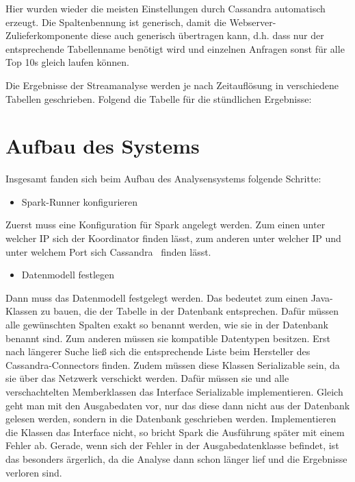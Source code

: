 \bigskip

Hier wurden wieder die meisten Einstellungen durch Cassandra automatisch
erzeugt. Die Spaltenbennung ist generisch, damit die
Webserver-Zulieferkomponente diese auch generisch übertragen kann, d.h.
dass nur der entsprechende Tabellenname benötigt wird und einzelnen
Anfragen sonst für alle Top 10s gleich laufen können.

\bigskip

Die Ergebnisse der Streamanalyse werden je nach Zeitauflösung in verschiedene Tabellen geschrieben.
Folgend die Tabelle für die stündlichen Ergebnisse:


\section{Aufbau des Systems}
Insgesamt fanden sich beim Aufbau des Analysensystems folgende Schritte:

\begin{itemize}
\item Spark-Runner konfigurieren
\end{itemize}
Zuerst muss eine Konfiguration für Spark angelegt werden. Zum einen
unter welcher IP sich der Koordinator finden lässt, zum anderen unter
welcher IP und unter welchem Port sich Cassandra \ finden lässt.

\begin{itemize}
\item Datenmodell festlegen
\end{itemize}
Dann muss das Datenmodell festgelegt werden. Das bedeutet zum einen
Java-Klassen zu bauen, die der Tabelle in der Datenbank
entsprechen. Dafür müssen alle gewünschten Spalten exakt so benannt
werden, wie sie in der Datenbank benannt sind. Zum anderen müssen sie
kompatible Datentypen besitzen. Erst nach längerer Suche ließ sich die
entsprechende Liste beim Hersteller des Cassandra-Connectors finden.
Zudem müssen diese Klassen Serializable sein, da sie über das Netzwerk
verschickt werden. Dafür müssen sie und alle verschachtelten
Memberklassen das Interface Serializable implementieren. Gleich geht
man mit den Ausgabedaten vor, nur das diese dann nicht aus der
Datenbank gelesen werden, sondern in die Datenbank geschrieben werden.
Implementieren die Klassen das Interface nicht, so bricht Spark die
Ausführung später mit einem Fehler ab. Gerade, wenn sich der Fehler in
der Ausgabedatenklasse befindet, ist das besonders ärgerlich, da die
Analyse dann schon länger lief und die Ergebnisse verloren sind.

